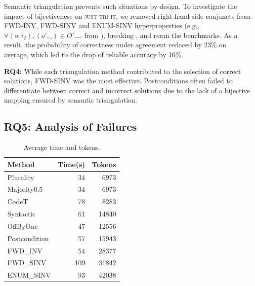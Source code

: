 \documentclass[acmsmall,screen,nonacm]{acmart}
\newcommand{\toolName}{\textsc{just-tri-it}\xspace}
\begin{document}
Semantic triangulation prevents such situations by design. To investigate the impact of bijectiveness on \toolName, we removed right-hand-side conjuncts from FWD-INV, FWD-SINV and ENUM-SINV hyperproperties (e.g., $\forall (o, i_2), (o', \_)\in O'. ...$ from ), breaking , and reran the benchmarks. As a result, the probability of correctness under agreement reduced by 23\% on average, which led to the drop of reliable accuracy by 16\%.

\begin{tcolorbox}[colback=gray!5, colframe=black!20, arc=2pt, boxrule=0.3mm, breakable, sharp corners, left=2pt, right=2pt, top=2pt, bottom=2pt]
\textbf{RQ4:} While each triangulation method contributed to the selection of correct solutions, FWD-SINV was the most effective. Postconditions often failed to differentiate between correct and incorrect solutions due to the lack of a bijective mapping ensured by semantic triangulation.
\end{tcolorbox}

\subsection{RQ5: Analysis of Failures}
\label{sec:failure_analysis}

\begin{table}
    \vspace{-4mm}
    \centering
    \small
    \setlength{\tabcolsep}{4pt}
    \caption{Average time and tokens.}
    \vspace{-3mm}
    \begin{tabular}{lrr}
        \toprule
        Method & Time(s) & Tokens \\
        \midrule
        Plurality     & 34   & 6973  \\
        Majority0.5   & 34   & 6973  \\
        CodeT         & 78   & 8283  \\
        Syntactic     & 61   & 14840 \\
        OffByOne      & 47   & 12556 \\
        Postcondition & 57   & 15943 \\
        FWD\_INV      & 54  & 28377 \\
        FWD\_SINV     & 109  & 31842 \\
        ENUM\_SINV    & 93 & 42038 \\
        \bottomrule
    \end{tabular}
    \label{tab:cost}
\end{table}
\end{document}
